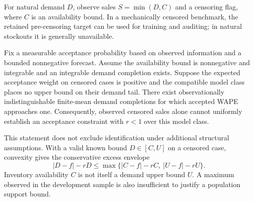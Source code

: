 For natural demand $D$, observe sales $S=\min(D,C)$ and a censoring flag, where $C$ is an availability bound. In a mechanically censored benchmark, the retained pre-censoring target can be used for training and auditing; in natural stockouts it is generally unavailable.

\begin{proposition}
\label{prop:identification}
Fix a measurable acceptance probability based on observed information and a bounded nonnegative forecast. Assume the availability bound is nonnegative and integrable and an integrable demand completion exists. Suppose the expected acceptance weight on censored cases is positive and the compatible model class places no upper bound on their demand tail. There exist observationally indistinguishable finite-mean demand completions for which accepted WAPE approaches one. Consequently, observed censored sales alone cannot uniformly establish an acceptance constraint with $r<1$ over this model class.
\end{proposition}
This statement does not exclude identification under additional structural assumptions. With a valid known bound $D\in[C,U]$ on a censored case, convexity gives the conservative excess envelope
\begin{equation}
 |D-f|-rD \leq
 \max\{|C-f|-rC,\ |U-f|-rU\}.
 \label{eq:envelope}
\end{equation}
Inventory availability $C$ is not itself a demand upper bound $U$. A maximum observed in the development sample is also insufficient to justify a population support bound.

